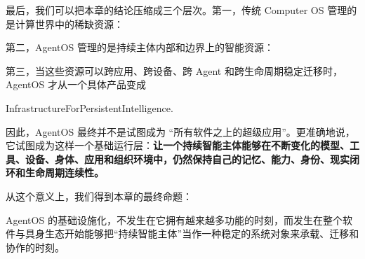 最后，我们可以把本章的结论压缩成三个层次。第一，传统 Computer OS 管理的是计算世界中的稀缺资源：
\begin{statementbox}
\centering
{}
\end{statementbox}
第二，AgentOS 管理的是持续主体内部和边界上的智能资源：
\begin{statementbox}
\centering
{}
\end{statementbox}
第三，当这些资源可以跨应用、跨设备、跨 Agent 和跨生命周期稳定迁移时，AgentOS 才从一个具体产品变成
\begin{statementbox}
InfrastructureForPersistentIntelligence.
\end{statementbox}

因此，AgentOS 最终并不是试图成为 ``所有软件之上的超级应用''。更准确地说，它试图成为这样一个基础运行层：\textbf{让一个持续智能主体能够在不断变化的模型、工具、设备、身体、应用和组织环境中，仍然保持自己的记忆、能力、身份、现实闭环和生命周期连续性。}

从这个意义上，我们得到本章的最终命题：
\begin{proposition*}
AgentOS 的基础设施化，不发生在它拥有越来越多功能的时刻，而发生在整个软件与具身生态开始能够把“持续智能主体”当作一种稳定的系统对象来承载、迁移和协作的时刻。
\end{proposition*}
